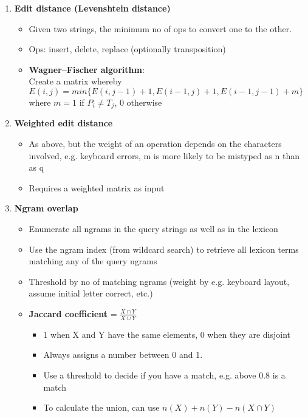 \documentclass[10pt,landscape,a4paper]{article}
\begin{document}
\begin{enumerate}
  \item \textbf{Edit distance (Levenshtein distance)}
        \begin{itemize}
          \item Given two strings, the minimum no of ops to convert one to the other.
          \item Ops: insert, delete, replace (optionally transposition)
          \item \textbf{Wagner–Fischer algorithm}:\\
                Create a matrix whereby $E(i, j) = min \{ E(i, j - 1) + 1, E(i - 1, j) + 1, E(i - 1, j - 1) + m \}$ where $m = 1$ if $P_i \neq T_j$, $0$ otherwise
        \end{itemize}
  \item \textbf{Weighted edit distance}
        \begin{itemize}
          \item As above, but the weight of an operation depends on the characters involved, e.g. keyboard errors, m is more likely to be mistyped as n than as q
          \item Requires a weighted matrix as input
        \end{itemize}
  \item \textbf{Ngram overlap}
        \begin{itemize}
          \item Enumerate all ngrams in the query strings as well as in the lexicon
          \item Use the ngram index (from wildcard search) to retrieve all lexicon terms matching any of the query ngrams
          \item Threshold by no of matching ngrams (weight by e.g. keyboard layout, assume initial letter correct, etc.)
          \item \textbf{Jaccard coefficient} = $\frac{X\cap Y}{X \cup Y}$
                \begin{itemize}
                  \item 1 when X and Y have the same elements, 0 when they are disjoint
                  \item Always assigns a number between 0 and 1.
                  \item Use a threshold to decide if you have a match, e.g. above 0.8 is a match
                  \item To calculate the union, can use $n(X) + n(Y) - n(X \cap Y)$
                \end{itemize}
        \end{itemize}
\end{enumerate}
\end{document}
